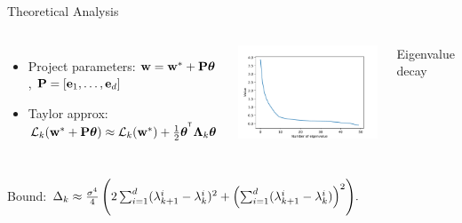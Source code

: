\documentclass{beamer}
\begin{document}
\begin{frame}{Theoretical Analysis}
    \begin{columns}[c]
        \begin{itemize}
            \item Project parameters: $\mathbf{w} = \mathbf{w}^* + \mathbf{P} \boldsymbol{\theta}$, $\mathbf{P} = [\mathbf{e}_1, \dots, \mathbf{e}_d]$
            \item Taylor approx: $\mathcal{L}_k (\mathbf{w}^* + \mathbf{P} \boldsymbol{\theta}) \approx \mathcal{L}_k (\mathbf{w}^*) + \tfrac12 \boldsymbol{\theta}^{^{\text{\tiny\sffamily\upshape\mdseries T}}} \boldsymbol{\Lambda}_k \boldsymbol{\theta}$
                  \bigskip
                  \bigskip
        \end{itemize}
        \includegraphics[width=1.0\textwidth]{img/eigenvalues.pdf}
        \vspace{0.5cm}\hspace{3.1cm}\raggedright{Eigenvalue decay}
    \end{columns}
    Bound:
    $ \Delta_k \approx
        \frac{\sigma^4}{4}\, \Biggl( 2 \sum_{i=1}^d (\lambda_{k+1}^i - \lambda_k^i)^2
        + \Bigl( \sum_{i=1}^d (\lambda_{k+1}^i - \lambda_k^i) \Bigr)^2 \Biggr).$
\end{frame}
\end{document}
